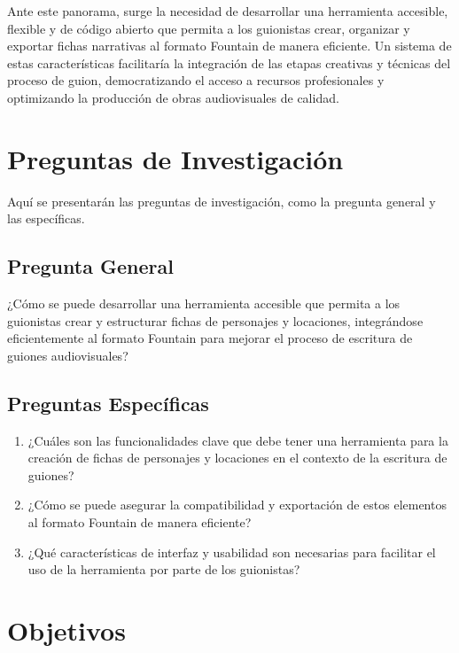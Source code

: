 \documentclass[12pt]{article}
\begin{document}
	Ante este panorama, surge la necesidad de desarrollar una herramienta accesible, flexible y de código abierto que permita a los guionistas crear, organizar y exportar fichas narrativas al formato Fountain de manera eficiente. Un sistema de estas características facilitaría la integración de las etapas creativas y técnicas del proceso de guion, democratizando el acceso a recursos profesionales y optimizando la producción de obras audiovisuales de calidad. \\

	 \newpage

	\section*{Preguntas de Investigación}

	Aquí se presentarán las preguntas de investigación, como la pregunta general y las específicas.

	\subsection*{Pregunta General}
	¿Cómo se puede desarrollar una herramienta accesible que permita a los guionistas crear y estructurar fichas de personajes y locaciones, integrándose eficientemente al formato Fountain para mejorar el proceso de escritura de guiones audiovisuales?

	\subsection*{Preguntas Específicas}
	\begin{enumerate}
		\item ¿Cuáles son las funcionalidades clave que debe tener una herramienta para la creación de fichas de personajes y locaciones en el contexto de la escritura de guiones?
		\item ¿Cómo se puede asegurar la compatibilidad y exportación de estos elementos al formato Fountain de manera eficiente?
		\item ¿Qué características de interfaz y usabilidad son necesarias para facilitar el uso de la herramienta por parte de los guionistas?
	\end{enumerate}

	\newpage

	\section*{Objetivos}
\end{document}
